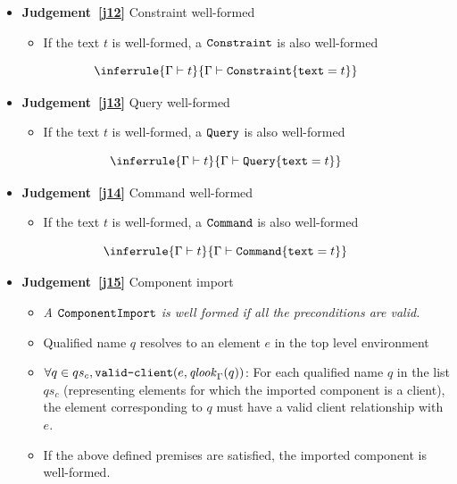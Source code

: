 \documentclass{article}
\begin{document}
\begin{itemize}
\item \textbf{Judgement~\ref{j12}} Constraint well-formed
\begin{itemize}
\item If the text $t$ is well-formed, a $\texttt{Constraint}$ is also well-formed
\end{itemize}
\end{itemize}

\begin{equation}
\label{j12}
\inferrule{
  \wbx{\env}{t}
}{
  \wbx{\env}{\lab{Constraint}\{\lab{text}=t\}}
}
\end{equation}

\begin{itemize}
\item \textbf{Judgement~\ref{j13}} Query well-formed
\begin{itemize}
\item If the text $t$ is well-formed, a $\texttt{Query}$ is also well-formed
\end{itemize}
\end{itemize}

\begin{equation}
\label{j13}
\inferrule{
  \wbx{\env}{t}
}{
  \wbx{\env}{\lab{Query}\{\lab{text}=t\}}
}
\end{equation}

\begin{itemize}
\item \textbf{Judgement~\ref{j14}} Command well-formed
\begin{itemize}
\item If the text $t$ is well-formed, a $\texttt{Command}$ is also well-formed
\end{itemize}
\end{itemize}

\begin{equation}
\label{j14}
\inferrule{
  \wbx{\env}{t}
}{
  \wbx{\env}{\lab{Command}\{\lab{text}=t\}}
}
\end{equation}

\begin{itemize}
\item \textbf{Judgement~\ref{j15}} Component import
\begin{itemize}
\item \textit{A $\texttt{ComponentImport}$ is well formed if all the preconditions are valid.}
\item Qualified name $q$ resolves to an element $e$ in the top level environment
\item $\forall q \in qs_c, \texttt{valid-client}({e},{\mathit{qlook}_{\Gamma}({q})})$: For each qualified name $q$ in the list $qs_c$ (representing elements for which the imported component is a client), the element corresponding to $q$ must have a valid client relationship with $e$.
\item If the above defined premises are satisfied, the imported component is well-formed.
\end{itemize}
\end{itemize}
\end{document}

